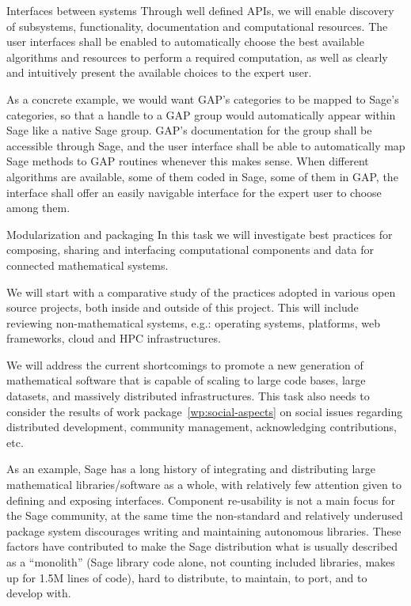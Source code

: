 \begin{Workpackage}{\thewpno}
\begin{task}{Interfaces between systems}
    Through well defined APIs, we will enable discovery of subsystems,
    functionality, documentation and computational resources. The user
    interfaces shall be enabled to automatically choose the best
    available algorithms and resources to perform a required
    computation, as well as clearly and intuitively present the
    available choices to the expert user.

    As a concrete example, we would want GAP's categories to be mapped
    to Sage's categories, so that a handle to a GAP group would
    automatically appear within Sage like a native Sage group. GAP's
    documentation for the group shall be accessible through Sage, and
    the user interface shall be able to automatically map Sage methods
    to GAP routines whenever this makes sense. When different
    algorithms are available, some of them coded in Sage, some of them
    in GAP, the interface shall offer an easily navigable interface
    for the expert user to choose among them.
  \end{task}

  \begin{task}{Modularization and packaging}
    In this task we will investigate best practices for composing,
    sharing and interfacing computational components and data for
    connected mathematical systems.

    We will start with a comparative study of the practices adopted in
    various open source projects, both inside and outside of this
    project. This will include reviewing non-mathematical systems,
    e.g.: operating systems, platforms, web frameworks, cloud and HPC
    infrastructures.

    We will address the current shortcomings to promote a new
    generation of mathematical software that is capable of scaling to
    large code bases, large datasets, and massively distributed
    infrastructures. This task also needs to consider the results of
    work package~\ref{wp:social-aspects} on social issues regarding
    distributed development, community management, acknowledging
    contributions, etc.

    As an example, Sage has a long history of integrating and
    distributing large mathematical libraries/software as a whole,
    with relatively few attention given to defining and exposing
    interfaces. Component re-usability is not a main focus for the
    Sage community, at the same time the non-standard and relatively
    underused package system discourages writing and maintaining
    autonomous libraries. These factors have contributed to make the
    Sage distribution what is usually described as a ``monolith''
    (Sage library code alone, not counting included libraries, makes
    up for 1.5M lines of code), hard to distribute, to maintain, to
    port, and to develop with.


\end{task}
\end{Workpackage}
